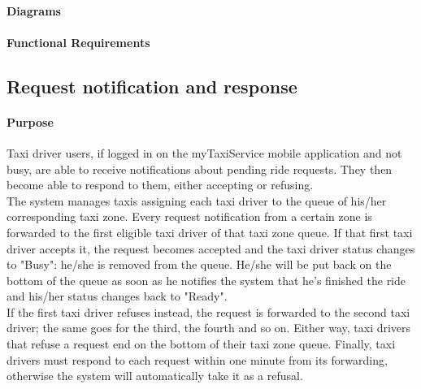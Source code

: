 \paragraph{Diagrams}

\paragraph{Functional Requirements}

\subsection{Request notification and response}

\paragraph{Purpose}

	Taxi driver users, if logged in on the myTaxiService mobile application and not busy, are able to receive notifications about pending ride requests. They then become able to respond to them, either accepting or refusing.\\
		The system manages taxis assigning each taxi driver to the queue of his/her corresponding taxi zone. Every request notification from a certain zone is forwarded to the first eligible taxi driver of that taxi zone queue. If that first taxi driver accepts it, the request becomes accepted and the taxi driver status changes to "Busy": he/she is removed from the queue. He/she will be put back on the bottom of the queue as soon as he notifies the system that he's finished the ride and his/her status changes back to "Ready".\\
		If the first taxi driver refuses instead, the request is forwarded to the second taxi driver; the same goes for the third, the fourth and so on. Either way, taxi drivers that refuse a request end on the bottom of their taxi zone queue. Finally, taxi drivers must respond to each request within one minute from its forwarding, otherwise the system will automatically take it as a refusal.

